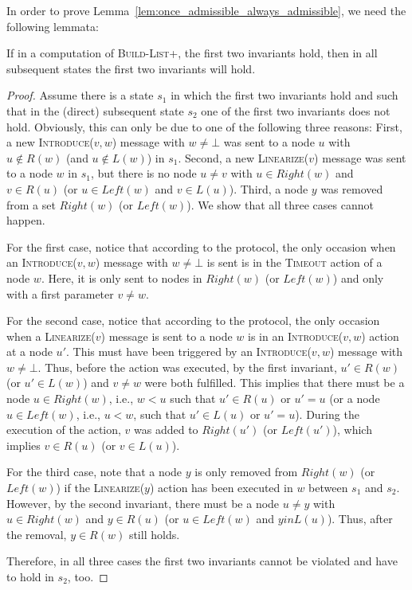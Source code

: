 \documentclass[a4paper,USenglish]{lipics}
\newcommand{\blp}{\textsc{Build-List+}\xspace}
\newcommand{\linearize}[1]{\textsc{Linearize(\ensuremath{#1})}\xspace}
\newcommand{\introduce}[1]{\textsc{Introduce(\ensuremath{#1})}\xspace}
\newcommand{\timeout}{\textsc{Timeout}\xspace}
\begin{document}
In order to prove Lemma~\ref{lem:once_admissible_always_admissible}, we need the following lemmata:
\begin{lemma}\label{lem:once_first_two_invariants_hold_then_always}
 If in a computation of \blp, the first two invariants hold, then in all subsequent states the first two invariants will hold.
\end{lemma}
\begin{proof}
 Assume there is a state $s_1$ in which the first two invariants hold and such that in the (direct) subsequent state $s_2$ one of the first two invariants does not hold.
 Obviously, this can only be due to one of the following three reasons:
 First, a new \introduce{v,w} message with $w \neq \bot$ was sent to a node $u$ with $u \notin R(w)$ (and $u \notin L(w)$) in $s_1$.
 Second, a new \linearize{v} message was sent to a node $w$ in $s_1$, but there is no node $u \neq v$ with $u \in Right(w)$ and $v \in R(u)$ (or $u \in Left(w)$ and $v \in L(u)$).
 Third, a node $y$ was removed from a set $Right(w)$ (or $Left(w)$).
 We show that all three cases cannot happen.
 
 For the first case, notice that according to the protocol, the only occasion when an \introduce{v,w} message with $w \neq \bot$ is sent is in the \timeout action of a node $w$.
 Here, it is only sent to nodes in $Right(w)$ (or $Left(w)$) and only with a first parameter $v \neq w$.
 
 For the second case, notice that according to the protocol, the only occasion when a \linearize{v} message is sent to a node $w$ is in an \introduce{v,w} action at a node $u'$.
 This must have been triggered by an \introduce{v,w} message with $w \neq \bot$.
 Thus, before the action was executed, by the first invariant, $u' \in R(w)$ (or $u' \in L(w)$) and $v \neq w$ were both fulfilled.
 This implies that there must be a node $u \in Right(w)$, i.e., $w < u$ such that $u' \in R(u)$ or $u' = u$ (or a node $u \in Left(w)$, i.e., $u < w$, such that $u' \in L(u)$ or $u' = u$).
 During the execution of the action, $v$ was added to $Right(u')$ (or $Left(u')$), which implies $v \in R(u)$ (or $v \in L(u)$).
 
 For the third case, note that a node $y$ is only removed from $Right(w)$ (or $Left(w)$) if the \linearize{y} action has been executed in $w$ between $s_1$ and $s_2$.
 However, by the second invariant, there must be a node $u \neq y$ with $u \in Right(w)$ and $y \in R(u)$ (or $u \in Left(w)$ and $y in L(u)$).
 Thus, after the removal, $y \in R(w)$ still holds.
 
 Therefore, in all three cases the first two invariants cannot be violated and have to hold in $s_2$, too.
\end{proof}
\end{document}
